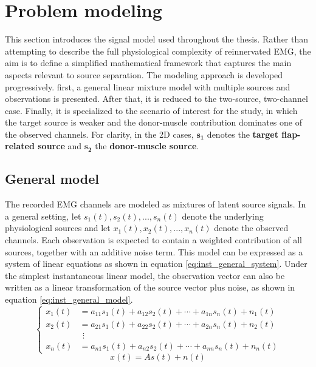 \section{Problem modeling}
\label{ch:problem_modeling}
This section introduces the signal model used throughout the thesis. Rather than attempting to describe the full physiological complexity of reinnervated EMG, the aim is to define a simplified mathematical framework that captures the main aspects relevant to source separation. The modeling approach is developed progressively. first, a general linear mixture model with multiple sources and observations is presented. After that, it is reduced to the two-source, two-channel case. Finally, it is specialized to the scenario of interest for the study, in which the target source is weaker and the donor-muscle contribution dominates one of the observed channels. For clarity, in the 2D cases, $\mathbf{s_1}$ denotes the \textbf{target flap-related source} and $\mathbf{s_2}$ the \textbf{donor-muscle source}. 
\clearpage

\subsection{General model}
The recorded EMG channels are modeled as mixtures of latent source signals. In a general setting, let $s_1(t), s_2(t),...,s_n(t)$ denote the underlying physiological sources and let $x_1(t),x_2(t),...,x_n(t)$ denote the observed channels. Each observation is expected to contain a weighted contribution of all sources, together with an additive noise term. This model can be expressed as a system of linear equations as shown in equation \ref{eq:inst_general_system}. Under the simplest instantaneous linear model, the observation vector can also be written as a linear transformation of the source vector plus noise, as shown in equation \ref{eq:inst_general_model}.
\begin{equation}
\left\{
\begin{aligned}
x_1(t) &= a_{11}s_1(t) + a_{12}s_2(t) + \cdots + a_{1n}s_n(t) + n_1(t) \\
x_2(t) &= a_{21}s_1(t) + a_{22}s_2(t) + \cdots + a_{2n}s_n(t) + n_2(t) \\
&\ \,\vdots \\
x_n(t) &= a_{n1}s_1(t) + a_{n2}s_2(t) + \cdots + a_{nn}s_n(t) + n_n(t)
\end{aligned}
\right.
\label{eq:inst_general_system}
\end{equation}
\begin{equation}
    x(t)=As(t)+n(t)
    \label{eq:inst_general_model}
\end{equation}

